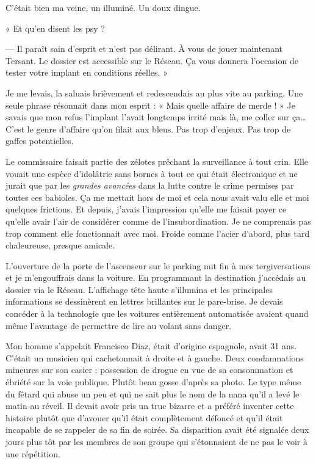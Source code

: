 C'était bien ma veine, un illuminé. Un doux dingue.

« Et qu'en disent les psy ?

— Il paraît sain d'esprit et n'est pas délirant. À vous de jouer maintenant Tersant. Le dossier est accessible sur le
Réseau. Ça vous donnera l'occasion de tester votre implant en conditions réelles. »

Je me levais, la saluais brièvement et redescendais au plus vite au parking. Une seule phrase résonnait dans mon
esprit : « Mais quelle affaire de merde ! » Je savais que mon refus l'implant l'avait longtemps irrité mais là, me 
coller sur ça… C'est le genre d'affaire qu'on filait aux bleus. Pas trop d'enjeux. Pas trop de gaffes potentielles.

Le commissaire faisait partie des zélotes prêchant la surveillance à tout crin. Elle vouait une espèce d'idolâtrie sans
bornes à tout ce qui était électronique et ne jurait que par les \emph{grandes avancées} dans la lutte contre le crime
permises par toutes ces babioles. Ça me mettait hors de moi et cela nous avait valu elle et moi quelques frictions. Et
depuis, j'avais l'impression qu'elle me faisait payer ce qu'elle avair l'air de considérer comme de l'insubordination. 
Je ne comprenais pas trop comment elle fonctionnait avec moi. Froide comme l'acier d'abord, plus tard chaleureuse, 
presque amicale.

L'ouverture de la porte de l'ascenseur sur le parking mit fin à mes tergiversations et je m'engouffrais dans la
voiture. En programmant la destination j'accédais au dossier via le Réseau. L'affichage tête haute s'illumina et les
principales informations se dessinèrent en lettres brillantes sur le pare-brise. Je devais concéder à la technologie
que les voitures entièrement automatisée avaient quand même l'avantage de permettre de lire au volant sans danger.

Mon homme s'appelait Francisco Diaz, était d'origine espagnole, avait 31 ans. C'était un musicien qui cachetonnait à
droite et à gauche. Deux condamnations mineures sur son casier : possession de drogue en vue de sa consommation et
ébriété sur la voie publique. Plutôt beau gosse d'après sa photo. Le type même du fêtard qui abuse un peu et qui ne sait
plus le nom de la nana qu'il a levé le matin au réveil. Il devait avoir pris un truc bizarre et a préféré inventer cette
histoire plutôt que d'avouer qu'il était complètement défoncé et qu'il était incapable de se rappeler de sa fin de 
soirée. Sa disparition avait été signalée deux jours plus tôt par les membres de son groupe qui s'étonnaient de ne pas 
le voir à une répétition.

